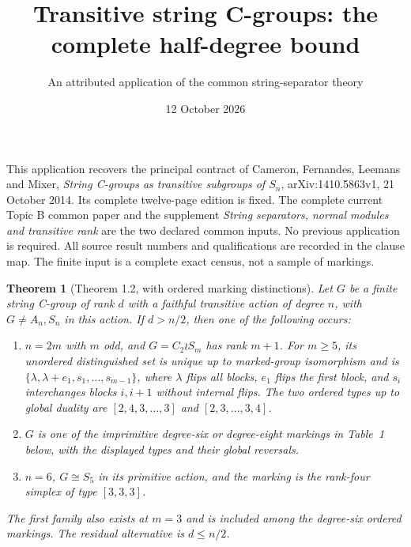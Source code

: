 \documentclass[11pt]{article}
\title{Transitive string C-groups: the complete half-degree bound}
\author{An attributed application of the common string-separator theory}
\date{12 October 2026}
\newtheorem{theorem}{Theorem}\newtheorem{corollary}{Corollary}
\begin{document}
\maketitle
This application recovers the principal contract of Cameron, Fernandes,
Leemans and Mixer, \emph{String C-groups as transitive subgroups of $S_n$},
arXiv:1410.5863v1, 21 October 2014. Its complete twelve-page edition is
fixed. The complete current Topic B common paper and the supplement
\emph{String separators, normal modules and transitive rank} are the
two declared common inputs. No previous application is required.
All source result numbers and qualifications are recorded in the clause map.
The finite input is a complete exact census, not a sample of markings.

\begin{theorem}[Theorem 1.2, with ordered marking distinctions]
Let $G$ be a finite string C-group of rank $d$ with a faithful transitive
action of degree $n$, with $G\ne A_n,S_n$ in this action.
If $d>n/2$, then one of the following occurs:
\begin{enumerate}
\item $n=2m$ with $m$ odd, and $G=C_2\wr S_m$ has rank $m+1$.
For $m\geq5$, its unordered distinguished set is unique up to marked-group
isomorphism and is $\{\lambda,\lambda+e_1,s_1,\ldots,s_{m-1}\}$,
where $\lambda$ flips all blocks, $e_1$ flips the first block, and
$s_i$ interchanges blocks $i,i+1$ without internal flips.
The two ordered types up to global duality are
$[2,4,3,\ldots,3]$ and $[2,3,\ldots,3,4]$.
\item $G$ is one of the imprimitive degree-six or degree-eight
markings in Table~1 below, with the displayed types and their global reversals.
\item $n=6$, $G\cong S_5$ in its primitive action, and the marking is
the rank-four simplex of type $[3,3,3]$.
\end{enumerate}
The first family also exists at $m=3$ and is included among the
degree-six ordered markings. The residual alternative is $d\leq n/2$.
\end{theorem}
\end{document}
